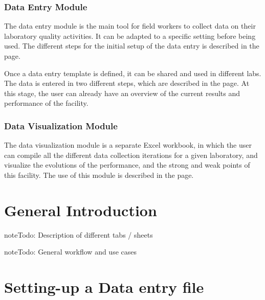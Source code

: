 \documentclass[letterpaper,10pt,english]{sphinxmanual}
\begin{document}
\subsection{Data Entry Module}
\label{\detokenize{intro:data-entry-module}}
The data entry module is the main tool for field workers to collect data on their laboratory quality activities. It can be adapted to a specific setting before being used. The different steps for the initial setup of the data entry is described in the {\hyperref[\detokenize{create_data_entry::doc}]{}} page.

Once a data entry template is defined, it can be shared and used in different labs. The data is entered in two different steps, which are described in the {\hyperref[\detokenize{fill_data_entry::doc}]{}} page. At this stage, the user can already have an overview of the current results and performance of the facility.


\subsection{Data Visualization Module}
\label{\detokenize{intro:data-visualization-module}}
The data visualization module is a separate Excel workbook, in which the user can compile all the different data collection iterations for a given laboratory, and visualize the evolutions of the performance, and the strong and weak points of this facility. The use of this module is described in the {\hyperref[\detokenize{data_viz::doc}]{}} page.


\chapter{General Introduction}
\label{\detokenize{general::doc}}\label{\detokenize{general:general-introduction}}
\begin{sphinxadmonition}{note}{\label{general:index-0}Todo:}
Description of different tabs / sheets
\end{sphinxadmonition}

\begin{sphinxadmonition}{note}{\label{general:index-1}Todo:}
General workflow and use cases
\end{sphinxadmonition}


\chapter{Setting-up a Data entry file}
\label{\detokenize{create_data_entry::doc}}\label{\detokenize{create_data_entry:setting-up-a-data-entry-file}}
\end{document}
